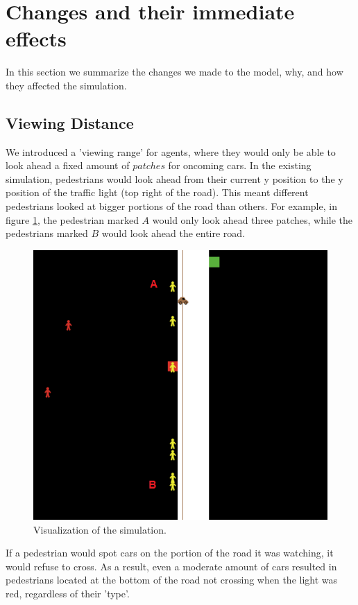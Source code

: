 \documentclass[a4paper]{article}
\begin{document}
\clearpage

\section{Changes and their immediate effects}
In this section we summarize the changes we made to the model, why, and how they affected the simulation.

\subsection{Viewing Distance}
We introduced a 'viewing range' for agents, where they would only be able to look ahead a fixed amount of $patches$ for oncoming cars. In the existing simulation, pedestrians would look ahead from their current y position to the y position of the traffic light (top right of the road). This meant different pedestrians looked at bigger portions of the road than others. For example, in figure \ref{ABlabel}, the pedestrian marked $A$ would only look ahead three patches, while the pedestrians marked $B$ would look ahead the entire road.

\begin{figure}[H]
\centering
\includegraphics[width=.75\textwidth]{socsim1.png}
\caption{Visualization of the simulation.}
\label{ABlabel}
\end{figure}

If a pedestrian would spot cars on the portion of the road it was watching, it would refuse to cross. As a result, even a moderate amount of cars resulted in pedestrians located at the bottom of the road not crossing when the light was red, regardless of their 'type'.
\end{document}
